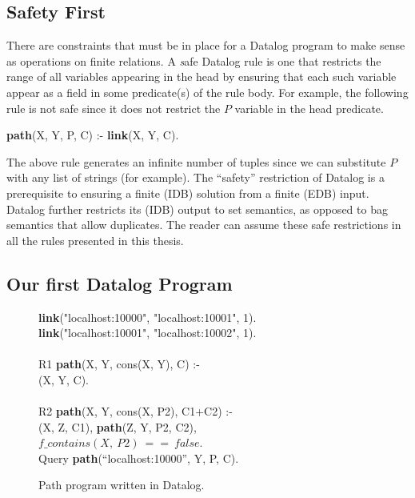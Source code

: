 \subsection{Safety First}

There are constraints that must be in place for a Datalog program to make sense
as operations on finite relations.  A {\emph safe} Datalog rule is one that
restricts the range of all variables appearing in the head by ensuring that
each such variable appear as a field in some predicate(s) of the rule body.
For example, the following rule is not safe since it does not restrict the $P$
variable in the  head predicate.

\begin{minipage}{\linewidth}
\ssp
{\bf path}(X, Y, P, C) :- {\bf link}(X, Y, C). \\
\end{minipage}
The above rule generates an infinite number of  tuples since we can
substitute $P$ with any list of strings (for example).  The ``safety''
restriction of Datalog is a prerequisite to ensuring a finite (IDB) solution
from a finite (EDB) input.  Datalog further restricts its (IDB) output to set
semantics, as opposed to bag semantics that allow duplicates.  The reader can
assume these safe restrictions in all the rules presented in this thesis.

\subsection{Our first Datalog Program}

\begin{figure}
\ssp
\begin{boxedminipage}{\linewidth}
{\bf link}("localhost:10000", "localhost:10001", 1). \\
{\bf link}("localhost:10001", "localhost:10002", 1). \\
\\
R1 {\bf path}(X, Y, cons(X, Y), C) :- \\
(X, Y, C). \\
\\       
R2 {\bf path}(X, Y, cons(X, P2), C1+C2) :- \\
(X, Z, C1), {\bf path}(Z, Y, P2, C2), \\
\datalogspace $f\_contains(X,\ P2)\ ==\ false$. \\

Query {\bf path}(``localhost:10000'', Y, P, C).
\end{boxedminipage}
\caption{\label{ch:p2:fig:datalogPath}Path program written in Datalog.}
\end{figure}

